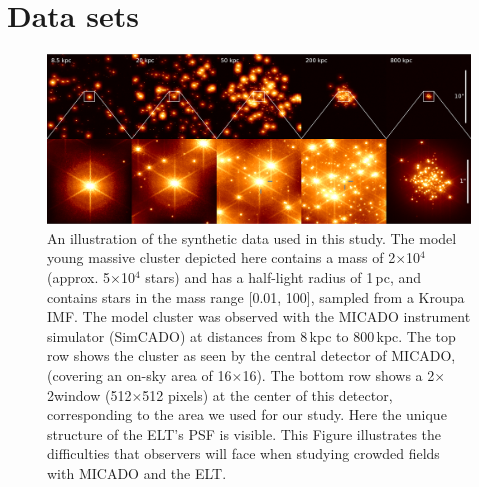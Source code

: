 \section{Data sets}
\label{sec:observations}


\begin{figure}
    \centering
    \includegraphics[width=\textwidth]{images/5_clusters.pdf}
    \caption{An illustration of the synthetic data used in this study. The model young massive cluster depicted here contains a mass of 2$\times$10$^4$\,\msun (approx. 5$\times$10$^4$ stars) and has a half-light radius of 1\,pc, and contains stars in the mass range [0.01, 100]\msun, sampled from a Kroupa IMF. The model cluster was observed with the MICADO instrument simulator (SimCADO) at distances from 8\,kpc to 800\,kpc. The top row shows the cluster as seen by the central detector of MICADO, (covering an on-sky area of 16\arcsec$\times$16\arcsec). The bottom row shows a 2\arcsec$\times$2\arcsec window (512$\times$512 pixels) at the center of this detector, corresponding to the area we used for our study. Here the unique structure of the ELT's PSF is visible. This Figure illustrates the difficulties that observers will face when studying crowded fields with MICADO and the ELT.
    }
    \label{fig:5_clusters}
\end{figure}


